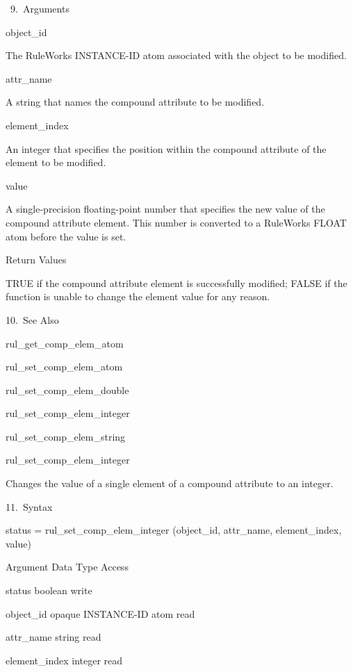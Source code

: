 {       9. Arguments

          object_id

          The RuleWorks INSTANCE-ID atom
          associated with the object to be
          modified.

          attr_name

          A string that names the compound
          attribute to be modified.

          element_index

          An integer that specifies the
          position within the compound
          attribute of the element to be
          modified.

          value

          A single-precision floating-point
          number that specifies the new value
          of the compound attribute element.
          This number is converted to a
          RuleWorks FLOAT atom before the
          value is set.

          Return Values

          TRUE if the compound attribute
          element is successfully modified;
          FALSE if the function is unable to
          change the element value for any
          reason.

      10. See Also

          rul_get_comp_elem_atom

          rul_set_comp_elem_atom

          rul_set_comp_elem_double

          rul_set_comp_elem_integer

          rul_set_comp_elem_string

          rul_set_comp_elem_integer

          Changes the value of a single
          element of a compound attribute to
          an integer.

      11. Syntax

          status = rul_set_comp_elem_integer
          (object_id, attr_name,
          element_index, value)

          Argument  Data Type     Access

          status  boolean     write

          object_id  opaque INSTANCE-ID atom
           read

          attr_name  string     read

          element_index  integer     read

}
